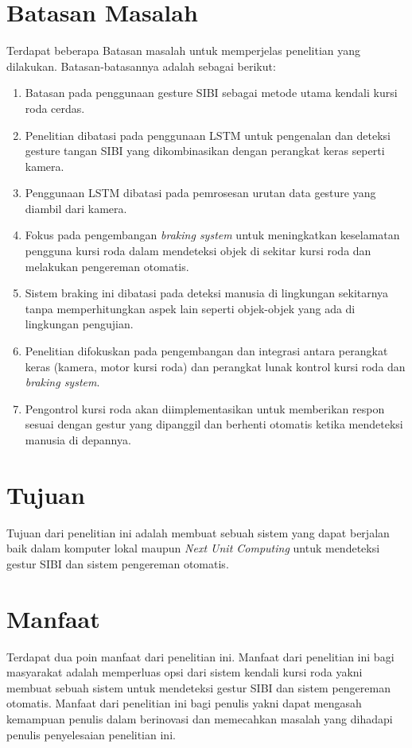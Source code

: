 \section{Batasan Masalah}

Terdapat beberapa Batasan masalah untuk memperjelas penelitian yang dilakukan. Batasan-batasannya adalah sebagai berikut:

\begin{enumerate}[nolistsep]
    \item Batasan pada penggunaan gesture SIBI sebagai metode utama kendali kursi roda cerdas.
    \item Penelitian dibatasi pada penggunaan LSTM untuk pengenalan dan deteksi gesture tangan SIBI yang dikombinasikan dengan perangkat keras seperti kamera.
    \item Penggunaan LSTM dibatasi pada pemrosesan urutan data gesture yang diambil dari kamera.
    \item Fokus pada pengembangan \emph{braking system }untuk meningkatkan keselamatan pengguna kursi roda dalam mendeteksi objek di sekitar kursi roda dan melakukan pengereman otomatis. 
    \item Sistem braking ini dibatasi pada deteksi manusia di lingkungan sekitarnya tanpa memperhitungkan aspek lain seperti objek-objek yang ada di lingkungan pengujian.
    \item Penelitian difokuskan pada pengembangan dan integrasi antara perangkat keras (kamera, motor kursi roda) dan perangkat lunak kontrol kursi roda dan \emph{braking system}.
    \item Pengontrol kursi roda akan diimplementasikan untuk memberikan respon sesuai dengan gestur yang dipanggil dan berhenti otomatis ketika mendeteksi manusia di depannya.
\end{enumerate}
\newpage

\section{Tujuan}

Tujuan dari penelitian ini adalah membuat sebuah sistem yang dapat berjalan baik dalam komputer lokal maupun \emph{Next Unit Computing} untuk mendeteksi gestur SIBI dan sistem pengereman otomatis.

\section{Manfaat}

Terdapat dua poin manfaat dari penelitian ini. Manfaat dari penelitian ini bagi masyarakat adalah memperluas opsi dari sistem kendali kursi roda yakni membuat sebuah sistem untuk mendeteksi gestur SIBI dan sistem pengereman otomatis. Manfaat dari penelitian ini bagi penulis yakni dapat mengasah kemampuan penulis dalam berinovasi dan memecahkan masalah yang dihadapi penulis penyelesaian penelitian ini.

